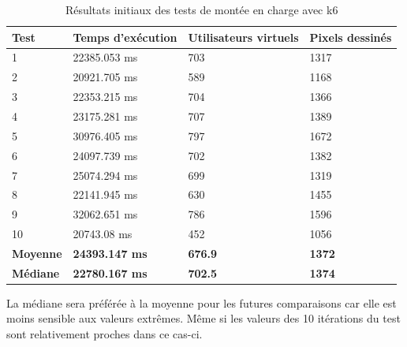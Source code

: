 \begin{table}[H]
  \centering
  \begin{tabular}{|l|l|l|l|}
    \hline
    \textbf{Test}    & \textbf{Temps d'exécution} & \textbf{Utilisateurs virtuels} & \textbf{Pixels dessinés} \\ \hline
    1                & 22385.053 ms               & 703                            & 1317                     \\ \hline
    2                & 20921.705 ms               & 589                            & 1168                     \\ \hline
    3                & 22353.215 ms               & 704                            & 1366                     \\ \hline
    4                & 23175.281 ms               & 707                            & 1389                     \\ \hline
    5                & 30976.405 ms               & 797                            & 1672                     \\ \hline
    6                & 24097.739 ms               & 702                            & 1382                     \\ \hline
    7                & 25074.294 ms               & 699                            & 1319                     \\ \hline
    8                & 22141.945 ms               & 630                            & 1455                     \\ \hline
    9                & 32062.651 ms               & 786                            & 1596                     \\ \hline
    10               & 20743.08 ms                & 452                            & 1056                     \\ \hline
    \textbf{Moyenne} & \textbf{24393.147 ms}      & \textbf{676.9}                 & \textbf{1372}            \\ \hline
    \textbf{Médiane} & \textbf{22780.167 ms}      & \textbf{702.5}                 & \textbf{1374}            \\ \hline
  \end{tabular}
  \caption{Résultats initiaux des tests de montée en charge avec k6}
  \label{table:k6-initial-results}
\end{table}

La médiane sera préférée à la moyenne pour les futures comparaisons car elle est moins sensible aux valeurs extrêmes. Même si les valeurs des 10 itérations du test sont relativement proches dans ce cas-ci.

